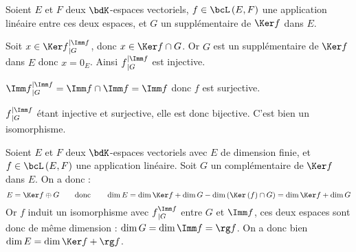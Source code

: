 \documentclass[a4paper,french,bookmarks]{article}
\begin{document}
\begin{enumerate}
    \noafter
    \nobefore
    \begin{nproof}
        Soient $E$ et $F$ deux $\bdK$-espaces vectoriels, $f \in \bcL\left(E, F\right)$ une application linéaire entre ces deux espaces, et $G$ un supplémentaire de $\Ker f$ dans $E$.
        \begin{enumerate}
            \itt Soit $x \in \Ker f{}_{\vert G}^{\vert \Imm f}$, donc $x \in \Ker f \cap G$. Or $G$ est un supplémentaire de $\Ker f$ dans $E$ donc $x = 0_E$. Ainsi $f{}_{\vert G}^{\vert \Imm f}$ est injective.
            
            \itt $\Imm f{}_{\vert G}^{\vert \Imm f} = \Imm f \cap \Imm f = \Imm f$ donc $f$ est surjective.
        \end{enumerate}
        
        $f{}_{\vert G}^{\vert \Imm f}$ étant injective et surjective, elle est donc bijective. C'est bien un isomorphisme.
    \end{nproof}
    \yesafter
    \begin{nproof}
        Soient $E$ et $F$ deux $\bdK$-espaces vectoriels avec $E$ de dimension finie, et $f \in \bcL\left(E, F\right)$ une application linéaire. Soit $G$ un complémentaire de $\Ker f$ dans $E$. On a donc :
        \[E = \Ker f \oplus G \qquad\text{donc}\qquad \dim E = \dim \Ker f + \dim G - \dim \left(\Ker\left(f\right) \cap G\right) = \dim \Ker f + \dim G\]
        Or $f$ induit un isomorphisme avec $f{}_{\mid G}^{\Imm f}$ entre $G$ et $\Imm f$, ces deux espaces sont donc de même dimension : $\dim G = \dim \Imm f = \rg f$. On a donc bien $\dim E = \dim \Ker f + \rg f$.
    \end{nproof}
    \yesbefore
    

\end{enumerate}
\end{document}

